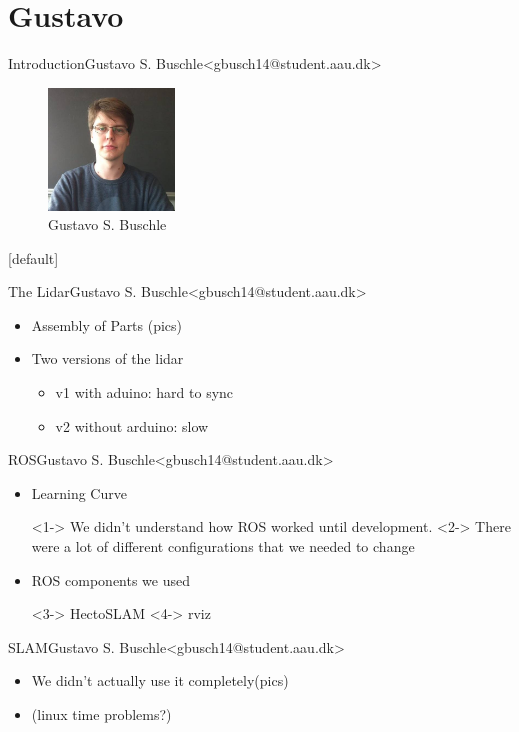 \section{Gustavo}

\begin{frame}{Introduction}{Gustavo S. Buschle\newline<gbusch14@student.aau.dk>}
    \begin{figure}[h!]
        \includegraphics[width=0.3\textwidth]{images/gustavo.jpg}
        \caption{Gustavo S. Buschle}
        \centering
    \end{figure}
\end{frame}
[default]

\begin{frame}{The Lidar}{Gustavo S. Buschle\newline<gbusch14@student.aau.dk>}
    \begin{itemize}
        \item <1-> Assembly of Parts (pics)

        \item <2-> Two versions of the lidar
        \begin{itemize}
            \item <3-> v1 with aduino: hard to sync
            \item <4-> v2 without arduino: slow
        \end{itemize}
    \end{itemize}
\end{frame}

\begin{frame}{ROS}{Gustavo S. Buschle\newline<gbusch14@student.aau.dk>}
    \begin{itemize}
        \item <1-> Learning Curve
            \begin{itemize}
                <1-> We didn't understand how ROS worked until development.
                <2-> There were a lot of different configurations that we needed to change
            \end{itemize}
        \item <3-> ROS components we used
            \begin{itemize}
                <3-> HectoSLAM
                <4-> rviz
            \end{itemize}
    \end{itemize}
\end{frame}

\begin{frame}{SLAM}{Gustavo S. Buschle\newline<gbusch14@student.aau.dk>}
    \begin{itemize}
        \item <1-> We didn't actually use it completely(pics)
        \item <2-> (linux time problems?)
    \end{itemize}
\end{frame}
